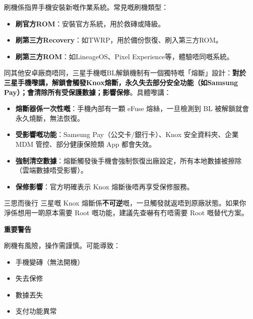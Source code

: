
刷機係指畀手機安裝新嘅作業系統。常見嘅刷機類型：

\begin{itemize}
  \item \textbf{刷官方ROM}：安裝官方系統，用於救磚或降級。
  \item \textbf{刷第三方Recovery}：如TWRP，用於備份恢復、刷入第三方ROM。
  \item \textbf{刷第三方ROM}：如LineageOS、Pixel Experience等，體驗唔同嘅系統。
\end{itemize}


同其他安卓廠商唔同，三星手機嘅BL解鎖機制有一個獨特嘅「熔斷」設計：\textbf{對於三星手機嚟講，解鎖會觸發Knox熔斷，永久失去部分安全功能（如Samsung Pay）；會清除所有受保護數據；影響保修}。具體嚟講：

\begin{itemize}
  \item \textbf{熔斷器係一次性嘅}：手機內部有一顆 eFuse 熔絲，一旦檢測到 BL 被解鎖就會永久燒斷，無法恢復。
  \item \textbf{受影響嘅功能}：Samsung Pay（公交卡/銀行卡）、Knox 安全資料夾、企業 MDM 管控、部分健康保險類 App 都會失效。
  \item \textbf{強制清空數據}：熔斷觸發後手機會強制恢復出廠設定，所有本地數據被擦除（雲端數據唔受影響）。
  \item \textbf{保修影響}：官方明確表示 Knox 熔斷後唔再享受保修服務。
\end{itemize}

\begin{tcbwarn}{三思而後行}
三星嘅 Knox 熔斷係\textbf{不可逆}嘅，一旦觸發就返唔到原廠狀態。如果你淨係想用一啲原本需要 Root 嘅功能，建議先查嚇有冇唔需要 Root 嘅替代方案。

\end{tcbwarn}

\textbf{重要警告}\par

刷機有風險，操作需謹慎。可能導致：

\begin{itemize}
  \item 手機變磚（無法開機）
  \item 失去保修
  \item 數據丟失
  \item 支付功能異常
\end{itemize}

